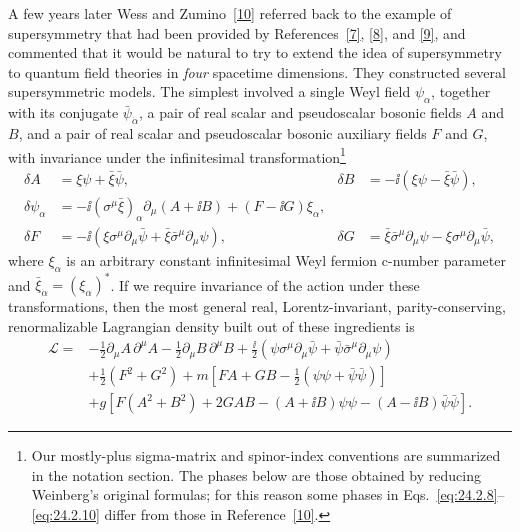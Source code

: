 A few years later Wess and Zumino~\hyperref[ch24-ref-10]{[10]} referred back
to the example of supersymmetry that had been provided by
References~\hyperref[ch24-ref-7]{[7]}, \hyperref[ch24-ref-8]{[8]}, and
\hyperref[ch24-ref-9]{[9]}, and commented that it would be natural to try to
extend the idea of supersymmetry to quantum field theories in \emph{four}
spacetime dimensions. They constructed several supersymmetric models. The
simplest involved a single Weyl field \(\psi_\alpha\), together with its
conjugate \(\bar\psi_{\dot\alpha}\), a pair of real scalar and pseudoscalar
bosonic fields \(A\) and \(B\), and a pair of real scalar and pseudoscalar
bosonic auxiliary fields \(F\) and \(G\), with invariance under the
infinitesimal transformation\footnote{Our mostly-plus sigma-matrix and
spinor-index conventions are summarized in the notation section.  The
phases below are those obtained by reducing Weinberg's original
formulas; for this reason some phases in
Eqs.~\eqref{eq:24.2.8}--\eqref{eq:24.2.10} differ from those in
Reference~\hyperref[ch24-ref-10]{[10]}.}
\begin{equation}
\begin{aligned}
\delta A&=\xi\psi+\bar\xi\bar\psi,
&
\delta B&=-\ii(\xi\psi-\bar\xi\bar\psi),
\\
\delta\psi_\alpha
&=-\ii(\sigma^\mu\bar\xi)_\alpha
  \partial_\mu(A+\ii B)+(F-\ii G)\xi_\alpha,
\\
\delta F&=-\ii\left(
  \xi\sigma^\mu\partial_\mu\bar\psi
  +\bar\xi\bar\sigma^\mu\partial_\mu\psi\right),
&
\delta G&=\bar\xi\bar\sigma^\mu\partial_\mu\psi
  -\xi\sigma^\mu\partial_\mu\bar\psi,
\end{aligned}
\tag{24.2.8}\label{eq:24.2.8}
\end{equation}
where \(\xi_\alpha\) is an arbitrary constant infinitesimal Weyl fermion
c-number parameter and \(\bar\xi_{\dot\alpha}=(\xi_\alpha)^*\). If we
require invariance of the action under these
transformations, then the most general real, Lorentz-invariant,
parity-conserving, renormalizable Lagrangian density built out of these
ingredients is
\begin{equation}
\begin{aligned}
\mathcal L={}&
-\frac12\partial_\mu A\,\partial^\mu A
-\frac12\partial_\mu B\,\partial^\mu B
+\frac{\ii}{2}\left(
  \psi\sigma^\mu\partial_\mu\bar\psi
  +\bar\psi\bar\sigma^\mu\partial_\mu\psi\right)
\\
&+\frac12(F^2+G^2)
+m\left[FA+GB-\frac12(\psi\psi+\bar\psi\bar\psi)\right]
\\
&+g\left[
F(A^2+B^2)+2GAB
-(A+\ii B)\psi\psi-(A-\ii B)\bar\psi\bar\psi
\right].
\end{aligned}
\tag{24.2.9}\label{eq:24.2.9}
\end{equation}
